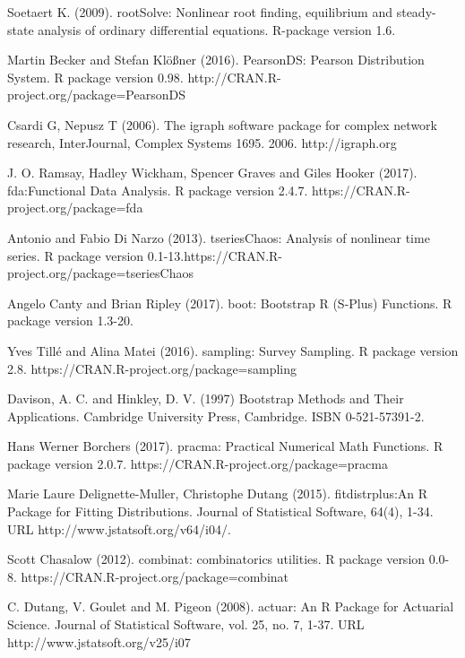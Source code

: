 \begin{thebibliography}{00}
	Soetaert K. (2009).  
	\newblock rootSolve: Nonlinear root finding, equilibrium and steady-state analysis of ordinary differential equations.  
	\newblock R-package version 1.6.
	
	Martin Becker and Stefan Klößner (2016). 
	\newblock PearsonDS: Pearson Distribution System. 
	\newblock R package version 0.98. http://CRAN.R-project.org/package=PearsonDS
	
	Csardi G, Nepusz T (2006).
	\newblock The igraph software package for complex network research,
	\newblock  InterJournal, Complex Systems 1695. 2006. http://igraph.org
	
	 J. O. Ramsay, Hadley Wickham, Spencer Graves and Giles Hooker (2017). 
	\newblock fda:Functional Data Analysis. 
	\newblock R package version 2.4.7. https://CRAN.R-project.org/package=fda
	
	 Antonio and Fabio Di Narzo (2013).
	\newblock tseriesChaos: Analysis of nonlinear time series. 
	\newblock R package version 0.1-13.https://CRAN.R-project.org/package=tseriesChaos
	
	 Angelo Canty and Brian Ripley (2017). 
	\newblock boot: Bootstrap R (S-Plus) Functions. 
	\newblock R package version 1.3-20.
	
	Yves Tillé and Alina Matei (2016). 
	\newblock sampling: Survey Sampling. 
	\newblock R package version 2.8. https://CRAN.R-project.org/package=sampling
	
	 Davison, A. C. and Hinkley, D. V. (1997) 
	\newblock Bootstrap Methods and Their Applications. 
	\newblock Cambridge University Press, Cambridge. ISBN 0-521-57391-2.
	
	Hans Werner Borchers (2017). 
	\newblock pracma: Practical Numerical Math Functions. 
	\newblock R package version 2.0.7. https://CRAN.R-project.org/package=pracma
	
	Marie Laure Delignette-Muller, Christophe Dutang (2015). 
	\newblock fitdistrplus:An R Package for Fitting Distributions. 
	\newblock Journal of Statistical Software, 64(4), 1-34. URL http://www.jstatsoft.org/v64/i04/.
	
	 Scott Chasalow (2012). 
	\newblock combinat: combinatorics utilities. 
	\newblock R package version 0.0-8. https://CRAN.R-project.org/package=combinat
	
	 C. Dutang, V. Goulet and M. Pigeon (2008). 
	\newblock actuar: An R Package for Actuarial Science. 
	\newblock Journal of Statistical Software, vol. 25, no. 7, 1-37. URL http://www.jstatsoft.org/v25/i07
	

\end{thebibliography}
